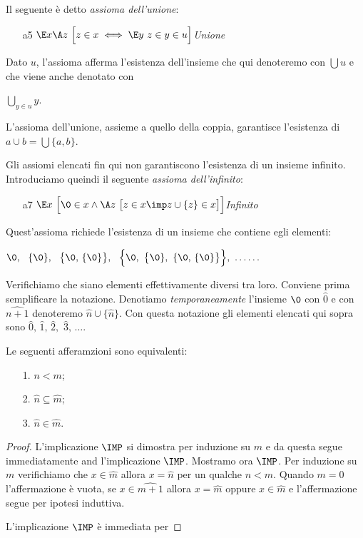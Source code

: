 Il seguente \`e detto \textit{assioma dell'unione}:
\begin{itemize}
\item[a5]$\E x \A z\ \Big[z\in x \iff \E y\ z\in y\in u\Big]$\hfill \emph{Unione}
\end{itemize}

Dato $u$, l'assioma afferma l'esistenza dell'insieme che qui denoteremo con $\bigcup u$ e che viene anche denotato con 

\hfil$\displaystyle \bigcup_{y\in u} y$.

L'assioma dell'unione, assieme a quello della coppia, garantisce l'esistenza di $a\cup b=\bigcup\{a,b\}$.

Gli assiomi elencati fin qui non garantiscono l'esistenza di un insieme infinito. Introduciamo queindi il seguente \textit{assioma dell'infinito}:

\begin{itemize}
\item[a7]$\E x\ \Big[\0\in x \wedge \A z\ \big[z\in x \imp z\cup\{z\}\in x\big]\Big]$\hfill\emph{Infinito} 
\end{itemize}

Quest'assioma richiede l'esistenza di un insieme che contiene egli elementi:

\hfil $\0,\ \  \{\0\},\ \  \big\{\0,\, \{\0\}\big\},\ \ \Big\{\0,\ \big\{\0\},\ \{\0,\, \{\0\}\big\}\Big\},\   \dots\dots$

Verifichiamo che siano elementi effettivamente diversi tra loro. Conviene prima semplificare la notazione. Denotiamo \textit{temporaneamente\/} l'insieme $\0$ con $\widehat{0}$ e con $\widehat{n+1}$ denoteremo $\widehat{n}\cup\{\widehat{n}\}$. Con questa notazione gli elementi elencati qui sopra sono $\widehat{0},\,\widehat{1},\,\widehat{2},\,\,\widehat{3},\,\dots$. %

\begin{remark}
Le seguenti afferamzioni sono equivalenti:
\begin{itemize}
\item[1.] $n<m$;
\item[2.] $\widehat{n}\subseteq\widehat{m}$;
\item[3.] $\widehat{n}\in\widehat{m}$.
\end{itemize}
\end{remark}
\begin{proof}
L'implicazione $\IMP$ si dimostra per induzione su $m$ e da questa segue immediatamente and l'implicazione $\IMP$. Mostramo ora  $\IMP$. Per induzione su $m$ verifichiamo che $x\in\widehat{m}$ allora $x=\widehat{n}$ per un qualche $n<m$. Quando $m=0$ l'affermazione \`e vuota, se $x\in \widehat{m+1}$ allora $x=\widehat{m}$ oppure $x\in\widehat{m}$ e l'affermazione segue per ipotesi induttiva. 

L'implicazione $\IMP$ \`e immediata per 
\end{proof}




